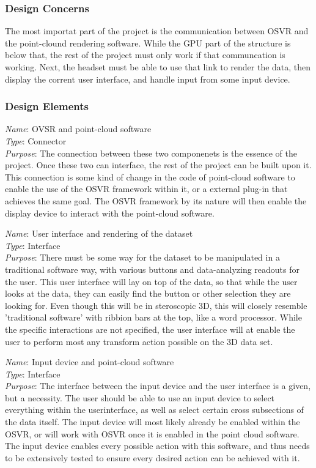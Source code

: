 \subsubsection{Design Concerns}
The most importat part of the project is the communication between OSVR and the point-clound rendering software.
While the GPU part of the structure is below that, the rest of the project must only work if that communcation is working.
Next, the headset must be able to use that link to render the data, then display the corrent user interface, and handle
input from some input device.

\subsubsection{Design Elements}

\textit{Name}: OVSR and point-cloud software\\
\textit{Type}: Connector\\
\textit{Purpose}: The connection between these two componenets is the essence of the project. Once these two can interface,
the rest of the project can be built upon it. This connection is some kind of change in the code of point-cloud software
to enable the use of the OSVR framework within it, or a external plug-in that achieves the same goal. The OSVR framework
by its nature will then enable the display device to interact with the point-cloud software.\\
\newline

\textit{Name}: User interface and rendering of the dataset\\
\textit{Type}: Interface\\
\textit{Purpose}: There must be some way for the dataset to be manipulated in a traditional software way, with various
buttons and data-analyzing readouts for the user. This user interface will lay on top of the data, so that while the user
looks at the data, they can easily find the button or other selection they are looking for. Even though this will be in
steroscopic 3D, this will closely resemble 'traditional software' with ribbion bars at the top, like a word processor.
While the specific interactions are not specified, the user interface will at enable the user to perform most any transform
action possible on the 3D data set.\\
\newline

\textit{Name}: Input device and point-cloud software\\
\textit{Type}: Interface\\
\textit{Purpose}: The interface between the input device and the user interface is a given, but a necessity. The user should
be able to use an input device to select everything within the userinterface, as well as select certain cross subsections of the
data itself. The input device will most likely already be enabled within the OSVR, or will work with OSVR once it is enabled
in the point cloud software. The input device enables every possible action with this software, and thus needs to be extensively
tested to ensure every desired action can be achieved with it.


